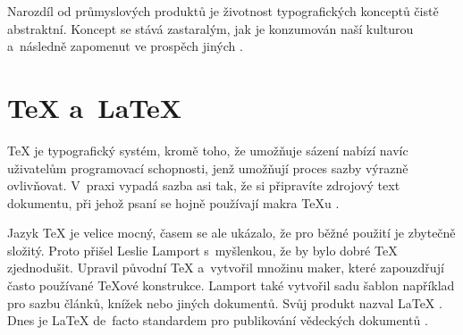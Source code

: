 \documentclass[a4paper,11pt]{article}
\begin{document}
Narozdíl od průmyslových produktů je životnost typografických
konceptů čistě abstraktní. Koncept se stává zastaralým, jak je konzumován naší kulturou a~následně zapomenut ve prospěch jiných \cite{Licko:Discovery_by_design}.

\section{{\TeX} a~\LaTeX}

{\TeX} je typografický systém, kromě toho, že umožňuje sázení nabízí navíc uživatelům programovací schopnosti, jenž umožňují proces sazby výrazně ovlivňovat. V~praxi vypadá sazba asi tak, že si připravíte zdrojový text dokumentu, při jehož psaní se hojně používají makra \TeX u \cite{Burda:Texty_texen}.

Jazyk {\TeX} je velice mocný, časem se ale ukázalo, že pro běžné použití je zbytečně složitý. Proto přišel Leslie Lamport s~myšlenkou, že by bylo dobré {\TeX} zjednodušit. Upravil původní {\TeX} a~vytvořil množinu maker, které zapouzdřují často používané \TeX ové konstrukce. Lamport také vytvořil sadu šablon například pro sazbu článků, knížek nebo jiných dokumentů. Svůj produkt nazval {\LaTeX}  \cite{Martinek:Latex}.
Dnes je {\LaTeX} de~facto standardem pro publikování vědeckých dokumentů \cite{Syropulos:TeX_conference}.

\newpage

\end{document}
